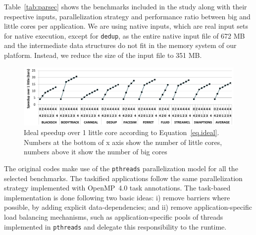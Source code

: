 Table~\ref{tab:parsec} shows the benchmarks included in the study along with their respective 
inputs, parallelization strategy and performance ratio between big and little cores per application. 
We are using native inputs, which are real input sets for native execution, except for \texttt{dedup}, as the entire native input file of 672 MB and the intermediate data structures do not fit in the memory system of our platform. 
Instead, we reduce the size of the input file to 351 MB.

\begin{figure}[t]%
	\centering
	\includegraphics[width=1\columnwidth]{figures/ideal_speedup_new.pdf}
	\caption{Ideal speedup over 1 little core according to Equation~\ref{eq.ideal}. Numbers at the bottom of x axis show the number of little cores, numbers above it show the number of big cores}
	\label{fig:ideal}%
\end{figure}

The original codes make use of the \texttt{pthreads} parallelization model for all the selected benchmarks. 
The taskified applications follow the same parallelization strategy implemented with OpenMP~4.0 task annotations.
The task-based implementation is done following two basic ideas: i) remove barriers where possible, by adding explicit data-dependencies; and ii) remove application-specific load balancing mechanisms, such as application-specific pools of threads implemented in \texttt{pthreads} and delegate this responsibility to the runtime.


